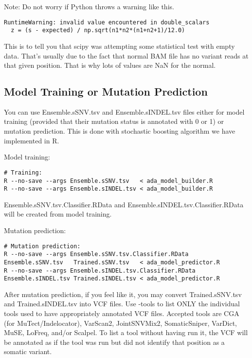 \documentclass[10pt,letterpaper]{article}
\begin{document}
\begin{sloppypar}
\begin{lstlisting}
\end{lstlisting}


Note: Do not worry if Python throws a warning like this. 

\begin{lstlisting}
RuntimeWarning: invalid value encountered in double_scalars
  z = (s - expected) / np.sqrt(n1*n2*(n1+n2+1)/12.0)
\end{lstlisting}

This is to tell you that scipy was attempting some statistical test with empty data. That's usually due to the fact that normal BAM file has no variant reads at that given position. That is why lots of values are NaN for the normal. 




\subsection{Model Training or Mutation Prediction}

You can use Ensemble.sSNV.tsv and Ensemble.sINDEL.tsv files either for model training (provided that their mutation status is annotated with 0 or 1) or mutation prediction. This is done with stochastic boosting algorithm we have implemented in R. 
	
Model training:
\begin{lstlisting}
# Training:
R --no-save --args Ensemble.sSNV.tsv   < ada_model_builder.R
R --no-save --args Ensemble.sINDEL.tsv < ada_model_builder.R
\end{lstlisting}
	
Ensemble.sSNV.tsv.Classifier.RData and Ensemble.sINDEL.tsv.Classifier.RData will be created from model training.
	

Mutation prediction:
	
\begin{lstlisting}
# Mutation prediction:
R --no-save --args Ensemble.sSNV.tsv.Classifier.RData   Ensemble.sSNV.tsv   Trained.sSNV.tsv   < ada_model_predictor.R
R --no-save --args Ensemble.sINDEL.tsv.Classifier.RData Ensemble.sINDEL.tsv Trained.sINDEL.tsv < ada_model_predictor.R
\end{lstlisting}

	
After mutation prediction, if you feel like it, you may convert Trained.sSNV.tsv and Trained.sINDEL.tsv into VCF files. Use -tools to list ONLY the individual tools used to have appropriately annotated VCF files. Accepted tools are CGA (for MuTect/Indelocator), VarScan2, JointSNVMix2, SomaticSniper, VarDict, MuSE, LoFreq, and/or Scalpel. To list a tool without having run it, the VCF will be annotated as if the tool was run but did not identify that position as a somatic variant. 



\end{sloppypar}
\end{document}
